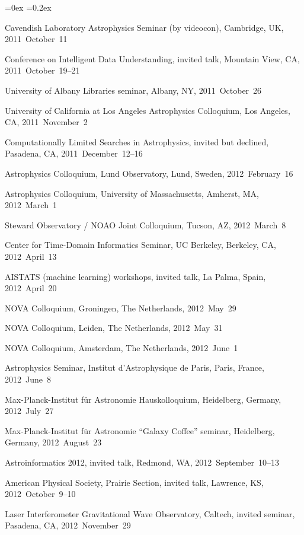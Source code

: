 \documentclass[12pt,letterpaper]{article}
\newcounter{refpubnum}
\newcommand{\hogglist}{%
    \rightmargin=0in
    \leftmargin=0.18in
    \topsep=0ex
    \partopsep=0pt
    \itemsep=0.2ex
    \parsep=0pt
    \itemindent=-1.0\leftmargin
    \listparindent=0.0\leftmargin
    \settowidth{\labelsep}{~}
    \usecounter{refpubnum}
  }
\begin{document}
\begin{list}{}{\hogglist}
{\item Cavendish Laboratory Astrophysics Seminar (by videocon),
          Cambridge, UK, 2011~October~11
\item Conference on Intelligent Data Understanding, invited talk,
          Mountain View, CA, 2011~October~19--21
\item University of Albany Libraries seminar,
          Albany, NY, 2011~October~26
\item University of California at Los Angeles Astrophysics Colloquium,
          Los Angeles, CA, 2011~November~2
\item Computationally Limited Searches in Astrophysics, invited but declined,
          Pasadena, CA, 2011~December~12--16
\item Astrophysics Colloquium, Lund Observatory,
          Lund, Sweden, 2012~February~16
\item Astrophysics Colloquium, University of Massachusetts,
          Amherst, MA, 2012~March~1
\item Steward Observatory / NOAO Joint Colloquium,
          Tucson, AZ, 2012~March~8
\item Center for Time-Domain Informatics Seminar, UC Berkeley,
          Berkeley, CA, 2012~April~13
\item AISTATS (machine learning) workshops, invited talk,
          La Palma, Spain, 2012~April~20
\item NOVA Colloquium,
          Groningen, The Netherlands, 2012~May~29
\item NOVA Colloquium,
          Leiden, The Netherlands, 2012~May~31
\item NOVA Colloquium,
          Amsterdam, The Netherlands, 2012~June~1
\item Astrophysics Seminar, Institut d'Astrophysique de Paris,
          Paris, France, 2012~June~8
\item Max-Planck-Institut f\"ur Astronomie Hauskolloquium,
          Heidelberg, Germany, 2012~July~27
\item Max-Planck-Institut f\"ur Astronomie ``Galaxy Coffee'' seminar,
          Heidelberg, Germany, 2012~August~23
\item Astroinformatics 2012, invited talk,
          Redmond, WA, 2012~September~10--13
\item American Physical Society, Prairie Section, invited talk,
          Lawrence, KS, 2012~October~9--10
\item Laser Interferometer Gravitational Wave Observatory, Caltech, invited seminar,
          Pasadena, CA, 2012~November~29
}
\end{list}
\end{document}
